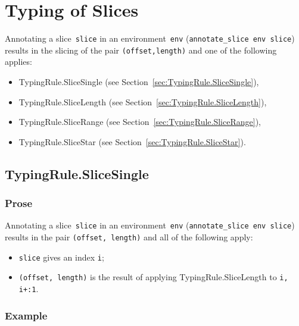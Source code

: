 \documentclass{book}
\begin{document}

\chapter{Typing of Slices \label{ch:typingslices}}

Annotating a slice~\texttt{slice} in an environment~\texttt{env}
(\texttt{annotate\_slice env slice}) results in the slicing of the pair \texttt{(offset,length)} and one of the following applies:
\begin{itemize}
\item TypingRule.SliceSingle (see Section~\ref{sec:TypingRule.SliceSingle}),
\item TypingRule.SliceLength (see Section~\ref{sec:TypingRule.SliceLength}),
\item TypingRule.SliceRange (see Section~\ref{sec:TypingRule.SliceRange}),
\item TypingRule.SliceStar (see Section~\ref{sec:TypingRule.SliceStar}).
\end{itemize}

\section{TypingRule.SliceSingle \label{sec:TypingRule.SliceSingle}}

  \subsection{Prose}
   Annotating a slice~\texttt{slice} in an environment~\texttt{env}
(\texttt{annotate\_slice env slice}) results in the pair \texttt{(offset,
length)} and all of the following apply: 
   \begin{itemize}
   \item \texttt{slice} gives an index \texttt{i};
   \item \texttt{(offset, length)} is the result of applying TypingRule.SliceLength to \texttt{i, i+:1}.
   \end{itemize}

  \subsection{Example}
\end{document}
